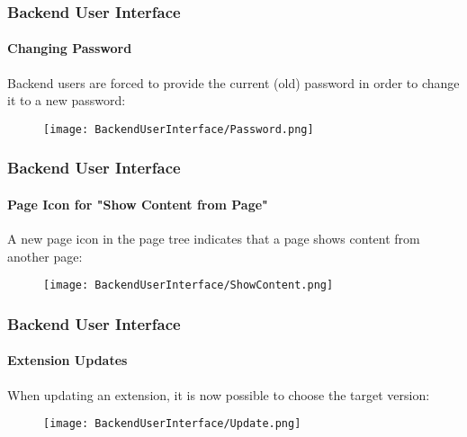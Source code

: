 \begin{frame}[fragile]
	\frametitle{Backend User Interface}
	\framesubtitle{Changing Password}

	Backend users are forced to provide the current (old) password in order to change
	it to a new password:

	\begin{figure}
		\texttt{[image: BackendUserInterface/Password.png]}
	\end{figure}

\end{frame}

\begin{frame}[fragile]
	\frametitle{Backend User Interface}
	\framesubtitle{Page Icon for "Show Content from Page"}

	A new page icon in the page tree indicates that a page shows content from another page:

	\begin{figure}
		\texttt{[image: BackendUserInterface/ShowContent.png]}
	\end{figure}

\end{frame}

\begin{frame}[fragile]
	\frametitle{Backend User Interface}
	\framesubtitle{Extension Updates}

	When updating an extension, it is now possible to choose the target version:

	\begin{figure}
		\texttt{[image: BackendUserInterface/Update.png]}
	\end{figure}

\end{frame}

